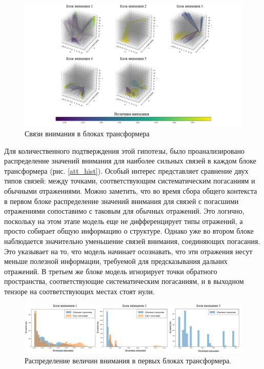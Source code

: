 \begin{figure}[H]
    \centering
    \includegraphics[width=1\textwidth]{figures/attention.png}
    \caption{Связи внимания в блоках трансформера}
    \label{attention_maps}
\end{figure}

Для количественного подтверждения этой гипотезы, было проанализировано распределение значений внимания для наиболее сильных связей в каждом блоке трансформера (рис. \ref{att_hist}). Особый интерес представляет сравнение двух типов связей: между точками, соответствующим систематическим погасаниям и обычными отражениями. Можно заметить, что во время сбора общего контекста в первом блоке распределение значений внимания для связей с погасшими отражениями сопоставимо с таковым для обычных отражений. Это логично, поскольку на этом этапе модель еще не дифференцирует типы отражений, а просто собирает общую информацию о структуре. Однако уже во втором блоке наблюдается значительно уменьшение связей внимания, соединяющих погасания. Это указывает на то, что модель начинает осознавать, что эти отражения несут меньше полезной информации, требуемой для предсказывания дальних отражений. В третьем же блоке модель игнорирует точки обратного пространства, соответствующие систематическим погасаниям, и в выходном тензоре на соответствующих местах стоят нули. 

\begin{figure}[H]
    \centering
    \includegraphics[width=1\textwidth]{figures/attention_hist.png}
    \caption{Распределение величин внимания в первых блоках трансформера.}
    \label{attention_maps}
\end{figure}

